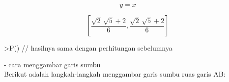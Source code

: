 \documentclass[a4paper,10pt]{article}
\begin{document}
\begin{eulernotebook}
\begin{eulercomment}
\begin{eulercomment}
\begin{eulerformula}
\[
y=x
\]
\end{eulerformula}
\begin{eulerformula}
\[
\left[ \frac{\sqrt{2}\,\sqrt{5}+2}{6} , \frac{\sqrt{2}\,\sqrt{5}+2
 }{6} \right] 
\]
\end{eulerformula}
\begin{eulerprompt}
>P() // hasilnya sama dengan perhitungan sebelumnya
\end{eulerprompt}
\begin{euleroutput}
  [0.86038,  0.86038]
\end{euleroutput}
\begin{eulercomment}
- cara menggambar garis sumbu\\
Berikut adalah langkah-langkah menggambar garis sumbu ruas garis AB:


\end{eulercomment}
\end{eulercomment}
\end{eulercomment}
\end{eulernotebook}
\end{document}

